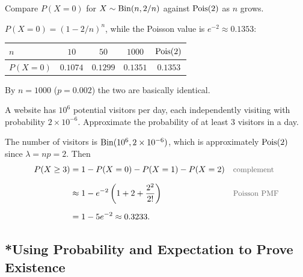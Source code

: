 \bigskip

\begin{example}
Compare $P(X = 0)$ for $X \sim \operatorname{Bin}(n, 2/n)$ against $\operatorname{Pois}(2)$ as $n$ grows.
\end{example}

\medskip

\begin{solution}
$P(X = 0) = (1 - 2/n)^{n}$, while the Poisson value is $e^{-2} \approx 0.1353$:
\medskip
\begin{center}
\begin{tabular}{@{}lcccc@{}}
\toprule
$n$ & $10$ & $50$ & $1000$ & $\operatorname{Pois}(2)$ \\
\midrule
$P(X = 0)$ & $0.1074$ & $0.1299$ & $0.1351$ & $0.1353$ \\
\bottomrule
\end{tabular}
\end{center}
\medskip
By $n = 1000$ ($p = 0.002$) the two are basically identical.
\end{solution}

\bigskip

\begin{example}\label{ex:website}
A website has $10^{6}$ potential visitors per day, each independently visiting with probability $2 \times 10^{-6}$. Approximate the probability of at least $3$ visitors in a day.
\end{example}

\medskip

\begin{solution}
The number of visitors is $\operatorname{Bin}(10^{6}, 2 \times 10^{-6})$, which is approximately $\operatorname{Pois}(2)$ since $\lambda = np = 2$. Then
\medskip
\begin{align*}
P(X \ge 3)
  &= 1 - P(X = 0) - P(X = 1) - P(X = 2)
  && \by{complement} \\[0.6em]
  &\approx 1 - e^{-2}\left(1 + 2 + \frac{2^{2}}{2!}\right)
  && \by{Poisson PMF} \\[0.6em]
  &= 1 - 5e^{-2} \approx 0.3233.
\end{align*}
\end{solution}

\bigskip

\subsection{*Using Probability and Expectation to Prove Existence}

